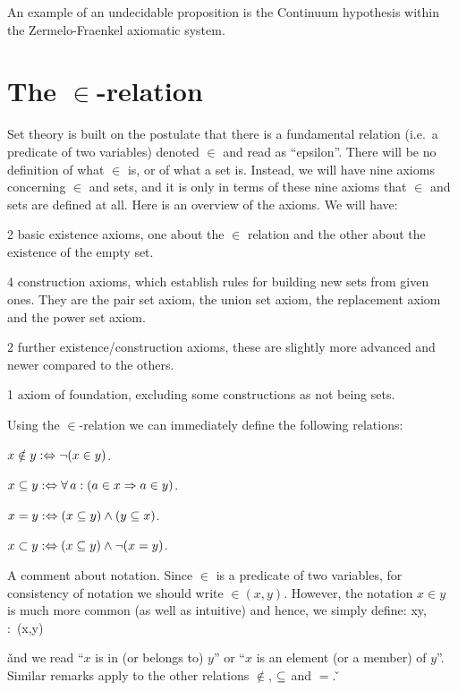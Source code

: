 An example of an undecidable proposition is the Continuum hypothesis within the Zermelo-Fraenkel axiomatic system.

\section[\texorpdfstring{The $\in$-relation}{The epsilon-relation}]{The $\in$-relation}

Set theory is built on the postulate that there is a fundamental relation (i.e.\ a predicate of two
variables) denoted $\in$\index{$\in$} and read as ``epsilon''. There will be no definition of what $\in$ is, or of
what a set is. Instead, we will have nine axioms concerning $\in$ and sets, and it is only in terms of these nine
axioms that $\in$ and sets are defined at all. Here is an overview of the axioms. We will have:
\bit
\item 2 basic existence axioms, one about the $\in$ relation and the other about the existence of the empty set.
\item 4 construction axioms, which establish rules for building new sets from given ones. They are the pair set axiom,
the union set axiom, the replacement axiom and the power set axiom.
\item 2 further existence/construction axioms, these are slightly more advanced and newer compared to the others.
\item 1 axiom of foundation, excluding some constructions as not being sets.
\eit

Using the $\in$-relation we can immediately define the following relations:
\bit
\item $x\notin y :\Leftrightarrow \neg(x\in y)$.
\item $x\subseteq y :\Leftrightarrow \forall \, a : (a\in x \Rightarrow a\in y)$.
\item $x = y :\Leftrightarrow (x\subseteq y) \land (y\subseteq x)$.
\item $x \subset y :\Leftrightarrow (x \subseteq y) \land \neg (x = y)$.
\eit

A comment about notation. Since $\in$ is a predicate of two variables, for consistency of notation we should write
$\in\!\!(x,y)$. However, the notation $x\in y$ is much more common (as well as intuitive) and hence, we simply define:
\bse
x\in y, :\eqv\ \in\!\!(x,y)
\ese

\v

and we read ``$x$ is in (or belongs to) $y$'' or ``$x$ is an element (or a member) of $y$''. Similar remarks apply to
the other relations $\notin$, $\subseteq$ and $=$. \v

